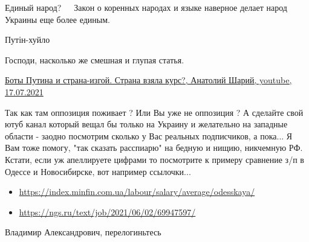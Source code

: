 \begin{itemize}
Единый народ? 🤣🤣🤣
Закон о коренных народах и языке наверное делает народ Украины еще более единым.

 
Путін-хуйло

 
Господи, насколько же смешная и глупая статья. 🤣

\href{https://youtu.be/RlH_kf_lUS8}{%
Боты Путина и страна-изгой. Страна взяла курс?, Анатолий Шарий, youtube, 17.07.2021%
}

 

Так как там оппозиция поживает ? Или Вы уже не оппозиция ? А сделайте свой ютуб
канал который вещал бы только на Украину и желательно на западные области -
заодно посмотрим сколько у Вас реальных подписчиков, а пока... Я Вам тоже
помогу, "так сказать расспиарю" на бедную и нищию, никчемную РФ. Кстати, если
уж апеллируете цифрами то посмотрите к примеру сравнение з/п в Одессе и
Новосибирске, вот например ссылочки... 

\begin{itemize}
  \item \url{https://index.minfin.com.ua/labour/salary/average/odesskaya/}
  \item \url{https://ngs.ru/text/job/2021/06/02/69947597/}
\end{itemize}

 
Владимир Александрович, перелогиньтесь

 

\end{itemize}
